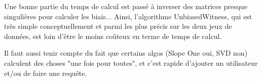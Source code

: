 \documentclass[11pt, openany, a4paper]{article}
\begin{document}
		Une bonne partie du temps de calcul est passé à inverser des matrices presque singulières pour calculer les biais... Ainsi, l'algorithme UnbiasedWitness, qui est très simple conceptuellement et parmi les plus précis sur les deux jeux de données, est loin d'être le moins coûteux en terme de temps de calcul.
				
		Il faut aussi tenir compte du fait que certains algos (Slope One oui, SVD non) calculent des choses "une fois pour toutes", et c'est rapide d'ajouter un utilisateur et/ou de faire une requête.
		


\end{document}
